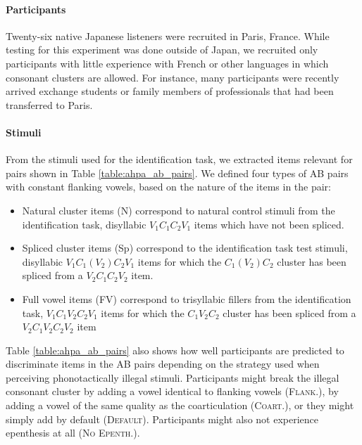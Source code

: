 {\paragraph{Participants}
Twenty-six native Japanese listeners were recruited in Paris, France. %
While testing for this experiment was done outside of Japan, we recruited only participants with little experience with French or other languages in which consonant clusters are allowed. For instance, many participants were recently arrived exchange students or family members of professionals that had been transferred to Paris.  

\paragraph{Stimuli}
From the stimuli used for the identification task, we extracted items relevant for pairs shown in Table \ref{table:ahpa_ab_pairs}.
We defined four types of AB pairs with constant flanking vowels, based on the nature of the items in the pair:

\begin{itemize}
\item Natural cluster items (N) correspond to natural control stimuli from the identification task, disyllabic $V_{1}C_{1}C_{2}V_{1}$ items which have not been spliced.
\item Spliced cluster items (Sp) correspond to the identification task test stimuli, disyllabic $V_{1}C_{1}(V_{2})C_{2}V_{1}$ items for which the $C_{1}(V_{2})C_{2}$ cluster has been spliced from a $V_{2}C_{1}C_{2}V_{2}$ item.
  \item Full vowel items (FV) correspond to trisyllabic fillers from the identification task, $V_{1}C_{1}V_{2}C_{2}V_{1}$ items for which the $C_{1}V_{2}C_{2}$ cluster has been spliced from a $V_{2}C_{1}V_{2}C_{2}V_{2}$ item
\end{itemize}

Table \ref{table:ahpa_ab_pairs} also shows how well participants are predicted to discriminate items in the AB pairs depending on the strategy used when perceiving phonotactically illegal stimuli. Participants might break the illegal consonant cluster by adding a vowel identical to flanking vowels (\textsc{Flank.}), by adding a vowel of the same quality as the coarticulation (\textsc{Coart.}), or they might simply add  by default (\textsc{Default}). Participants might also not experience epenthesis at all (\textsc{No Epenth.}).   

}
